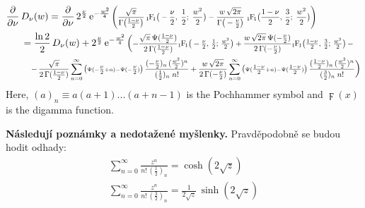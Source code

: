 \begin{align*}
    \pd{}{\nu} \, &D_\nu(w)
    = \pd{}{\nu} \, 2^{\frac{\nu}{2}} \,
    \e{-\frac{w^2\!}{4}} \,
    \scalemath{0.8}{
    \Bigg(
        \frac{\sqrt{\pi}}{\Gamma\big( \frac{1-\nu}{2} \big)} \,
        \hypF\big( -\frac{\nu}{2}, \; \frac{1}{2} ; \; \frac{w^2}{2} \big)
        - \frac{w \, \sqrt{2\pi}}{\Gamma\big( -\frac{\nu}{2} \big)} \;
        \hypF\big( \frac{1-\nu}{2}, \, \frac{3}{2} ; \; \frac{w^2}{2} \big)
    \Bigg)
    }
    \\
    &= \frac{\ln 2}{2} \, D_\nu(w) + 2^{\frac{\nu}{2}} \,
    \e{-\frac{w^2\!}{4}} \, \Big(
        \scalemath{0.8}{
            -\frac{\sqrt{\pi} \, \digamma(\frac{1-\nu}{2})}{2 \, \Gamma(\frac{1-\nu}{2})}
            \hypF\big( -\tfrac{\nu}{2}, \, \tfrac{1}{2}; \, \tfrac{w^2}{2} \big)
            +\frac{w \, \sqrt{2\pi} \, \digamma(-\frac{\nu}{2})}{2 \, \Gamma(-\frac{\nu}{2})}
            \hypF\big( \tfrac{1-\nu}{2}, \, \tfrac{3}{2}; \, \tfrac{w^2}{2} \big)
            \, -
        }
        \\
        &\ph{=} \;
        \scalemath{0.8}{
            - \, \frac{\sqrt{\pi}}{2 \, \Gamma(\frac{1-\nu}{2})}
            \sum_{n=0}^\infty \big({ \scriptstyle \digamma(-\tfrac{\nu}{2}+n) - \digamma(-\tfrac{\nu}{2}) }\big) \, \frac{(-\tfrac{\nu}{2})_n \, (\frac{w^2}{2})^n}{(\tfrac{1}{2})_n \; n!}
            + \frac{w \, \sqrt{2\pi}}{2 \, \Gamma(-\frac{\nu}{2})}
            \sum_{n=0}^\infty \big({ \scriptstyle \digamma(\tfrac{1-\nu}{2}+n) - \digamma(\tfrac{1-\nu}{2}) }\big) \, \frac{(\tfrac{1-\nu}{2})_n \, (\tfrac{w^2}{2})^n}{(\tfrac{3}{2})_n \; n!}
        }
    \Big)
\end{align*}
Here, $(a)_n \equiv a (a+1) ... (a+n-1)$ is the Pochhammer symbol and $\digamma(x)$ is the digamma function.

\textbf{Následují poznámky a nedotažené myšlenky.} Pravděpodobně se budou hodit odhady:
\begin{gather*}
    \sum_{n=0}^\infty \frac{z^n}{n! \, (\tfrac{1}{2})_n}
    = \cosh(2 \sqrt{z})
    \\[5pt]
    \sum_{n=0}^\infty \frac{z^n}{n! \, (\tfrac{3}{2})_n}
    = \frac{1}{2\sqrt{z}} \, \sinh(2 \sqrt{z})
\end{gather*}






